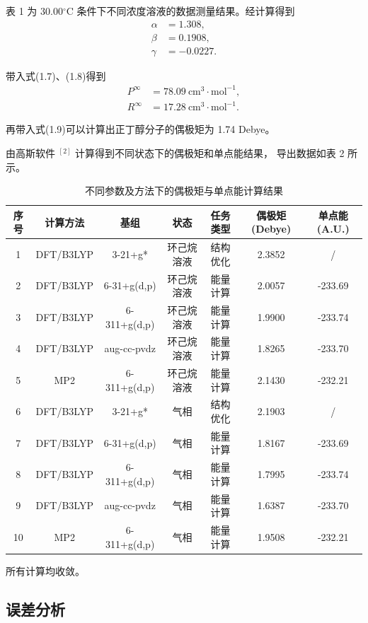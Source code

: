 \documentclass[12pt]{ctexart}
\numberwithin{equation}{section}
\begin{document}
表 1 为 30.00$^\circ$C 条件下不同浓度溶液的数据测量结果。经计算得到
\begin{align}
    \alpha &= 1.308, \\
    \beta &= 0.1908, \\
    \gamma &= -0.0227.
\end{align}

带入式(1.7)、(1.8)得到
\begin{align}
    P^\infty &= 78.09 ~\mathrm{cm^3\cdot mol^{-1}}, \\
    R^\infty &= 17.28 ~\mathrm{cm^3\cdot mol^{-1}}.
\end{align}

再带入式(1.9)可以计算出正丁醇分子的偶极矩为 1.74 Debye。

由高斯软件 $^{[2]}$ 计算得到不同状态下的偶极矩和单点能结果，
导出数据如表 2 所示。

\begin{longtable}{ccccccc}
    \caption{不同参数及方法下的偶极矩与单点能计算结果} \\
    \hline
    序号 & 计算方法 & 基组 & 状态 & 任务类型 & 偶极矩(Debye)
        & 单点能(A.U.) \\
    \hline
     1 & DFT/B3LYP &   3-21+g*    & 环己烷溶液 & 结构优化 & 2.3852 & / \\
     2 & DFT/B3LYP & 6-31+g(d,p)  & 环己烷溶液 & 能量计算 & 2.0057 & -233.69 \\
     3 & DFT/B3LYP & 6-311+g(d,p) & 环己烷溶液 & 能量计算 & 1.9900 & -233.74 \\
     4 & DFT/B3LYP & aug-cc-pvdz  & 环己烷溶液 & 能量计算 & 1.8265 & -233.70 \\
     5 &    MP2    & 6-311+g(d,p) & 环己烷溶液 & 能量计算 & 2.1430 & -232.21 \\
     6 & DFT/B3LYP &   3-21+g*    &    气相   & 结构优化 & 2.1903 & / \\
     7 & DFT/B3LYP & 6-31+g(d,p)  &    气相   & 能量计算 & 1.8167 & -233.69 \\
     8 & DFT/B3LYP & 6-311+g(d,p) &    气相   & 能量计算 & 1.7995 & -233.74 \\
     9 & DFT/B3LYP & aug-cc-pvdz  &    气相   & 能量计算 & 1.6387 & -233.70 \\
    10 &    MP2    & 6-311+g(d,p) &    气相   & 能量计算 & 1.9508 & -232.21 \\
    \hline
\end{longtable}

所有计算均收敛。

\subsection{误差分析}
\end{document}
